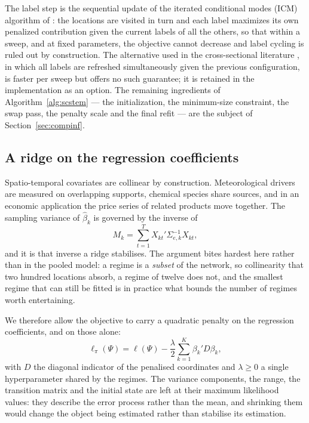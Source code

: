 The label step is the sequential update of the iterated conditional modes (ICM) algorithm of \citet{Besag1986}: the locations are visited in turn and each label maximizes its own penalized contribution given the current labels of all the others, so that within a sweep, and at fixed parameters, the objective cannot decrease and label cycling is ruled out by construction. The alternative used in the cross-sectional literature \citep{SugasawaMurakami2021}, in which all labels are refreshed simultaneously given the previous configuration, is faster per sweep but offers no such guarantee; it is retained in the implementation as an option. The remaining ingredients of Algorithm~\ref{alg:scstem} --- the initialization, the minimum-size constraint, the swap pass, the penalty scale and the final refit --- are the subject of Section~\ref{sec:compinf}.

\subsection{A ridge on the regression coefficients}\label{sec2:ridge}

Spatio-temporal covariates are collinear by construction. Meteorological drivers are measured on overlapping supports, chemical species share sources, and in an economic application the price series of related products move together. The sampling variance of $\hat\beta_k$ is governed by the inverse of
\begin{equation}
  M_k = \sum_{t=1}^{T} X_{kt}' \Sigma_{e,k}^{-1} X_{kt},
  \label{eq:Mk}
\end{equation}
and it is that inverse a ridge stabilises. The argument bites hardest here rather than in the pooled model: a regime is a \emph{subset} of the network, so collinearity that two hundred locations absorb, a regime of twelve does not, and the smallest regime that can still be fitted is in practice what bounds the number of regimes worth entertaining.

We therefore allow the objective to carry a quadratic penalty on the regression coefficients, and on those alone:
\begin{equation}
  \ell_\pi(\Psi) = \ell(\Psi) - \frac{\lambda}{2}\sum_{k=1}^{K} \beta_k' D \beta_k ,
  \label{eq:ridge}
\end{equation}
with $D$ the diagonal indicator of the penalised coordinates and $\lambda \ge 0$ a single hyperparameter shared by the regimes. The variance components, the range, the transition matrix and the initial state are left at their maximum likelihood values: they describe the error process rather than the mean, and shrinking them would change the object being estimated rather than stabilise its estimation.

